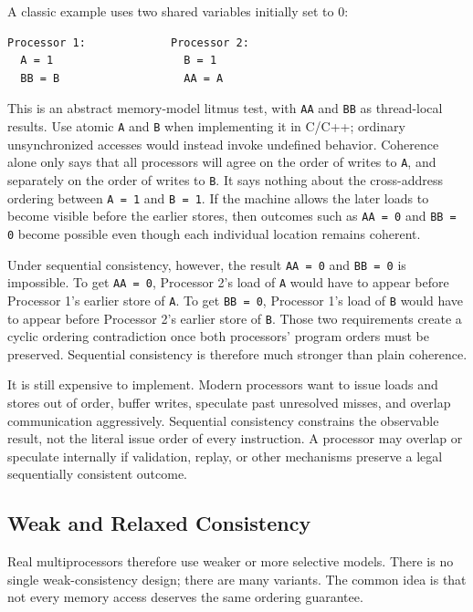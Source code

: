 A classic example uses two shared variables initially set to 0:
\begin{verbatim}
Processor 1:             Processor 2:
  A = 1                    B = 1
  BB = B                   AA = A
\end{verbatim}
This is an abstract memory-model litmus test, with \texttt{AA} and \texttt{BB} as thread-local results.
Use atomic \texttt{A} and \texttt{B} when implementing it in C/C++; ordinary unsynchronized accesses would instead invoke undefined behavior.
Coherence alone only says that all processors will agree on the order of writes to \texttt{A}, and separately on the order of writes to \texttt{B}.
It says nothing about the cross-address ordering between \texttt{A = 1} and \texttt{B = 1}.
If the machine allows the later loads to become visible before the earlier stores, then outcomes such as \texttt{AA = 0} and \texttt{BB = 0} become possible even though each individual location remains coherent.

Under sequential consistency, however, the result \texttt{AA = 0} and \texttt{BB = 0} is impossible.
To get \texttt{AA = 0}, Processor 2's load of \texttt{A} would have to appear before Processor 1's earlier store of \texttt{A}.
To get \texttt{BB = 0}, Processor 1's load of \texttt{B} would have to appear before Processor 2's earlier store of \texttt{B}.
Those two requirements create a cyclic ordering contradiction once both processors' program orders must be preserved.
Sequential consistency is therefore much stronger than plain coherence.

It is still expensive to implement.
Modern processors want to issue loads and stores out of order, buffer writes, speculate past unresolved misses, and overlap communication aggressively.
Sequential consistency constrains the observable result, not the literal issue order of every instruction.
A processor may overlap or speculate internally if validation, replay, or other mechanisms preserve a legal sequentially consistent outcome.

\subsection*{Weak and Relaxed Consistency}
Real multiprocessors therefore use weaker or more selective models.
There is no single weak-consistency design; there are many variants.
The common idea is that not every memory access deserves the same ordering guarantee.

